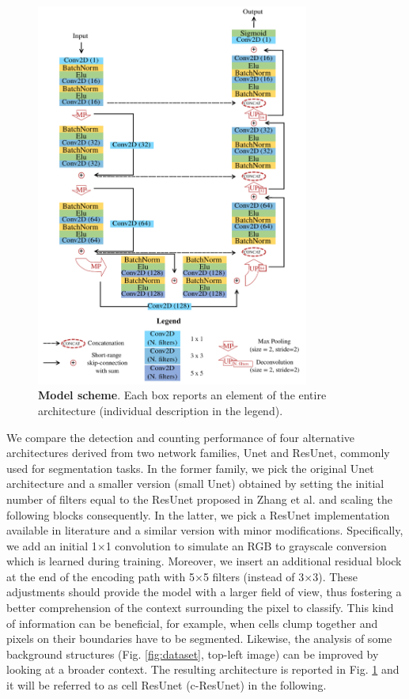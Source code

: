 \begin{figure}
\centerline{
\includegraphics[width=0.8\textwidth]{figures/130_methods/c-resunet_architecture.pdf}
}
\caption{\textbf{Model scheme}. Each box reports an element of the entire architecture (individual description in the legend). 
} \label{fig:model_architecture}
\end{figure}
We compare the detection and counting performance of four alternative architectures derived from two network families, Unet and ResUnet, commonly used for segmentation tasks.
In the former family, we pick the original Unet architecture \cite{unet} and a smaller version (small Unet) obtained by setting the initial number of filters equal to the ResUnet proposed in Zhang et al. \cite{deep_resunet} and scaling the following blocks consequently.
In the latter, we pick a ResUnet implementation available in literature \cite{deep_resunet} and a similar version with minor modifications.
Specifically, we add an initial 1$\times$1 convolution to simulate an RGB to grayscale conversion which is learned during training.
Moreover, we insert an additional residual block at the end of the encoding path with 5$\times$5 filters (instead of 3$\times$3). These adjustments should provide the model with a larger field of view, thus fostering a better comprehension of the context surrounding the pixel to classify.
This kind of information can be beneficial, for example, when cells clump together and pixels on their boundaries have to be segmented. 
Likewise, the analysis of some background structures (Fig. \ref{fig:dataset}, top-left image) can be improved by looking at a broader context.
The resulting architecture is reported in Fig. \ref{fig:model_architecture} and it will be referred to as cell ResUnet (c-ResUnet) in the following.

